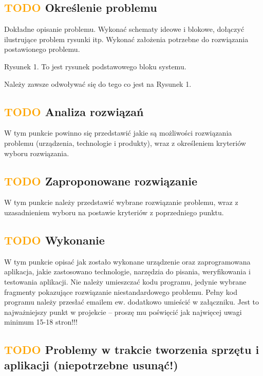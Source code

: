 \documentclass[11pt,titlepage,a4paper]{article}
\begin{document}
\subsection{\textcolor{orange}{TODO} Określenie problemu}

Dokładne opisanie problemu. Wykonać schematy ideowe i blokowe, dołączyć ilustrujące problem rysunki itp. Wykonać założenia potrzebne do rozwiązania postawionego problemu.

Rysunek 1. To jest rysunek podstawowego bloku systemu.

Należy zawsze odwoływać się do tego co jest na Rysunek 1.

\subsection{\textcolor{orange}{TODO} Analiza rozwiązań}

W tym punkcie powinno się przedstawić jakie są możliwości rozwiązania problemu (urządzenia, technologie i produkty), wraz z określeniem kryteriów wyboru rozwiązania.

\subsection{\textcolor{orange}{TODO} Zaproponowane rozwiązanie}

W tym punkcie należy przedstawić wybrane rozwiązanie problemu, wraz z uzasadnieniem wyboru na postawie kryteriów z poprzedniego punktu.

\subsection{\textcolor{orange}{TODO} Wykonanie}

W tym punkcie opisać jak zostało wykonane urządzenie oraz zaprogramowana aplikacja, jakie zastosowano technologie, narzędzia do pisania, weryfikowania i testowania aplikacji. Nie należy umieszczać kodu programu, jedynie wybrane fragmenty pokazujące rozwiązanie niestandardowego problemu. Pełny kod programu należy przesłać emailem ew. dodatkowo umieścić w załączniku.
Jest to najważniejszy punkt w projekcie – proszę mu poświęcić jak najwięcej uwagi minimum 15-18 stron!!!

\subsection{\textcolor{orange}{TODO} Problemy w trakcie tworzenia sprzętu i aplikacji (niepotrzebne usunąć!)}
\end{document}
